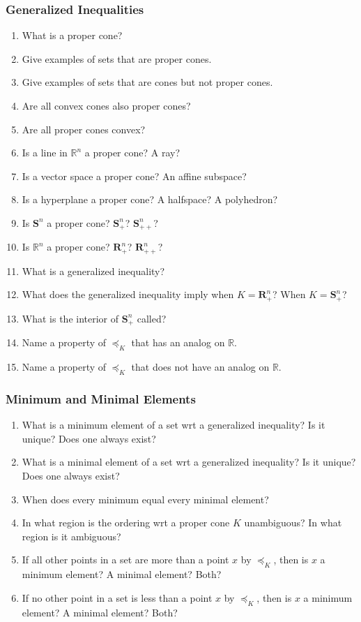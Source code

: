 \documentclass[]{article}
\newcommand{\R}{\mathbb{R}}
\newcommand{\Rn}{\mathbb{R}^{n}}
\newcommand{\Rnp}{\boldsymbol{R}^{n}_{+}}
\newcommand{\Rnpp}{\boldsymbol{R}^{n}_{++}}
\newcommand{\Sn}{\boldsymbol{S}^{n}}
\newcommand{\Snp}{\boldsymbol{S}^{n}_{+}}
\newcommand{\Snpp}{\boldsymbol{S}^{n}_{++}}
\newcounter{q}
\begin{document}
\subsubsection*{Generalized Inequalities}

\begin{enumerate}[resume*]
\item What is a proper cone?
\item Give examples of sets that are proper cones.
\item Give examples of sets that are cones but not proper cones.
\item Are all convex cones also proper cones?
\item Are all proper cones convex?
\item Is a line in $\Rn$ a proper cone? A ray?
\item Is a vector space a proper cone? An affine subspace?
\item Is a hyperplane a proper cone? A halfspace? A polyhedron?
\item Is $\Sn$ a proper cone? $\Snp$? $\Snpp$?
\item Is $\Rn$ a proper cone? $\Rnp$? $\Rnpp$?
\item What is a generalized inequality?
\item What does the generalized inequality imply when $K=\Rnp$? When $K=\Snp$?
\item What is the interior of $\Snp$ called?
\item Name a property of $\preceq_{K}$ that has an analog on $\R$.
\item Name a property of $\preceq_{K}$ that does not have an analog on $\R$.
\end{enumerate}

\subsubsection*{Minimum and Minimal Elements}

\begin{enumerate}[resume*]
\item What is a minimum element of a set wrt a generalized inequality? Is it unique? Does one always exist?
\item What is a minimal element of a set wrt a generalized inequality? Is it unique? Does one always exist?
\item When does every minimum equal every minimal element?
\item In what region is the ordering wrt a proper cone $K$ unambiguous? In what region is it ambiguous?
\item If all other points in a set are more than a point $x$ by $\preceq_{K}$, then is $x$ a minimum element? A minimal element? Both?
\item If no other point in a set is less than a point $x$ by $\preceq_{K}$, then is $x$ a minimum element? A minimal element? Both?
\end{enumerate}
\end{document}
